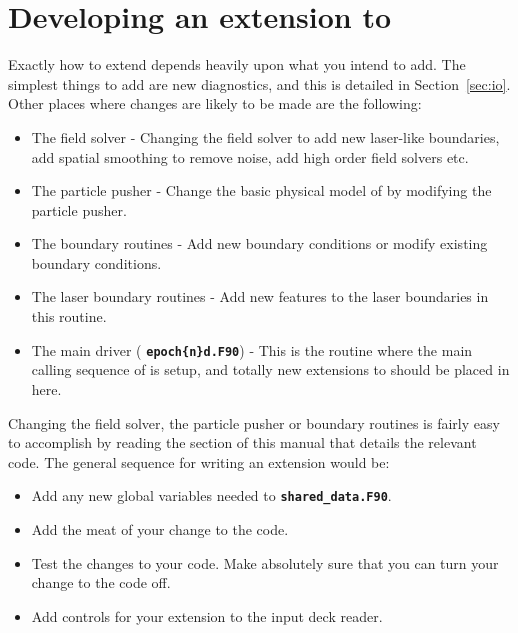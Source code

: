 \documentclass[12pt,a4paper]{article}
\newcommand{\inlinecode}[1]{{\color{warwickred} \bf\texttt{#1}}}
\newcommand{\sect}[1]{Section~\ref{sec:#1}}
\newcommand{\EPOCH}{{\color{warwickdark}\fontfamily{phv}\selectfont{EPOCH}}}
\begin{document}
\section{Developing an extension to {\EPOCH}}
\label{sec:extend}

Exactly how to extend {\EPOCH} depends heavily upon what you intend to add. The
simplest things to add are new diagnostics, and this is detailed in
\sect{io}. Other places where changes are likely to be made
are the following:
\begin{itemize}
\item The field solver - Changing the field solver to add new laser-like
  boundaries, add spatial smoothing to remove noise, add high order field
  solvers etc.
\item The particle pusher - Change the basic physical model of {\EPOCH} by
  modifying the particle pusher.
\item The boundary routines - Add new boundary conditions or modify existing
  boundary conditions.
\item The laser boundary routines - Add new features to the laser boundaries in
  this routine.
\item The main driver (\inlinecode{epoch\{n\}d.F90}) - This is the routine
  where the main calling sequence of {\EPOCH} is setup, and totally new
  extensions to {\EPOCH} should be placed in here.
\end{itemize}

Changing the field solver, the particle pusher or boundary routines
is fairly easy to accomplish by reading the section of this manual that
details the relevant code. The general sequence for writing an extension
would be:
\begin{itemize}
\item Add any new global variables needed to \inlinecode{shared\_data.F90}.
\item Add the meat of your change to the code.
\item Test the changes to your code. Make absolutely sure that you can turn your
  change to the code off.
\item Add controls for your extension to the input deck reader.
\end{itemize}
\end{document}
